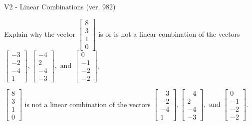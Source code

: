 \begin{exercise}
  \begin{exerciseTitle}V2 - Linear Combinations (ver. 982)\end{exerciseTitle}
  \begin{exerciseStatement}
    Explain why the vector \(\left[\begin{array}{c}
8 \\
3 \\
1 \\
0
\end{array}\right]\)  is or is not a linear 
	combination of the vectors \(\left[\begin{array}{c}
-3 \\
-2 \\
-4 \\
1
\end{array}\right] , \left[\begin{array}{c}
-4 \\
2 \\
-4 \\
-3
\end{array}\right] , \text{ and } \left[\begin{array}{c}
0 \\
-1 \\
-2 \\
-2
\end{array}\right]\).
	


  \end{exerciseStatement}
  \begin{exerciseAnswer}
   \(\left[\begin{array}{c}
8 \\
3 \\
1 \\
0
\end{array}\right]\) 
  	 is not  
	a linear combination of the vectors \(\left[\begin{array}{c}
-3 \\
-2 \\
-4 \\
1
\end{array}\right] , \left[\begin{array}{c}
-4 \\
2 \\
-4 \\
-3
\end{array}\right] , \text{ and } \left[\begin{array}{c}
0 \\
-1 \\
-2 \\
-2
\end{array}\right]\).

	
  


  \end{exerciseAnswer}
\end{exercise}